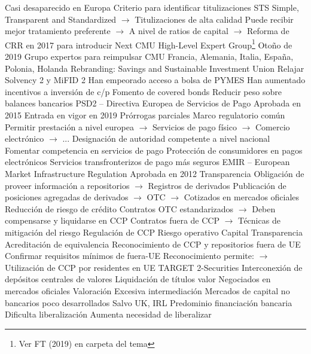 \documentclass{nuevotema}
\begin{document}
\begin{esquemal}
				\4[] Casi desaparecido en Europa
				\4 Criterio para identificar titulizaciones STS
				\4[] Simple, Transparent and Standardized
				\4[] $\to$ Titulizaciones de alta calidad
				\4[] Puede recibir mejor tratamiento preferente
				\4[] $\to$ A nivel de ratios de capital
				\4[] $\to$ Reforma de CRR en 2017 para introducir
			\3 Next CMU High-Level Expert Group\footnote{Ver FT (2019) en carpeta del tema}
				\4 Otoño de 2019
				\4 Grupo expertos para reimpulsar CMU
				\4 Francia, Alemania, Italia, España, Polonia, Holanda
				\4 Rebranding:
				\4[] Savings and Sustainable Investment Union
				\4 Relajar Solvency 2 y MiFID 2
				\4[] Han empeorado acceso a bolsa de PYMES
				\4[] Han aumentado incentivos a inversión de c/p
				\4 Fomento de covered bonds
				\4[] Reducir peso sobre balances bancarios
			\3 PSD2 -- Directiva Europea de Servicios de Pago
				\4 Aprobada en 2015
				\4 Entrada en vigor en 2019
				\4[] Prórrogas parciales
				\4 Marco regulatorio común
				\4[] Permitir prestación a nivel europea
				\4[] $\to$ Servicios de pago físico
				\4[] $\to$ Comercio electrónico
				\4[] $\to$ ...
				\4 Designación de autoridad competente a nivel nacional
				\4 Fomentar competencia en servicios de pago
				\4 Protección de consumidores en pagos electrónicos
				\4 Servicios transfronterizos de pago más seguros
			\3 EMIR -- European Market Infrastructure Regulation
				\4 Aprobada en 2012
				\4 Transparencia
				\4[] Obligación de proveer información a repositorios
				\4[] $\to$ Registros de derivados
				\4[] Publicación de posiciones agregadas de derivados
				\4[] $\to$ OTC
				\4[] $\to$ Cotizados en mercados oficiales
				\4 Reducción de riesgo de crédito
				\4[] Contratos OTC estandarizados
				\4[] $\to$ Deben compensarse y liquidarse en CCP
				\4[] Contratos fuera de CCP
				\4[] $\to$ Técnicas de mitigación del riesgo
				\4 Regulación de CCP
				\4[] Riesgo operativo
				\4[] Capital
				\4[] Transparencia
				\4 Acreditación de equivalencia
				\4[] Reconocimiento de CCP y repositorios fuera de UE
				\4[] Confirmar requisitos mínimos de fuera-UE
				\4[] Reconocimiento permite:
				\4[] $\to$ Utilización de CCP por residentes en UE
			\3 TARGET 2-Securities
				\4 Interconexión de depósitos centrales de valores
				\4 Liquidación de títulos valor
				\4[] Negociados en mercados oficiales
		\2 Valoración
			\3 Excesiva intermediación
				\4 Mercados de capital no bancarios poco desarrollados
				\4[] Salvo UK, IRL
			\3 Predominio financiación bancaria
				\4 Dificulta liberalización
				\4 Aumenta necesidad de liberalizar

\end{esquemal}
\end{document}
